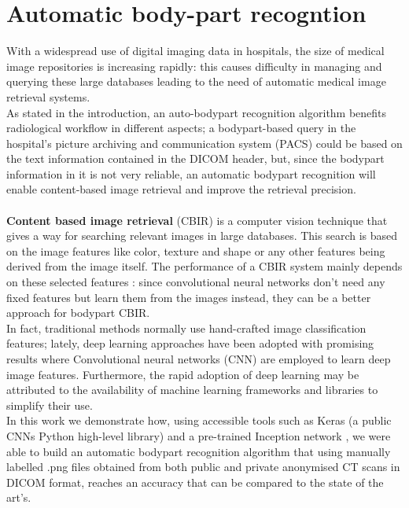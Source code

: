 \documentclass[../main.tex]{subfiles}
\begin{document}


\clearpage
\newpage
\section{Automatic body-part recogntion}
With a widespread use of digital imaging data in hospitals, the size of medical image repositories is increasing rapidly: this causes difficulty in managing and querying these large databases leading to the need of automatic medical image retrieval systems. \cite{Qayyum2017} \\
As stated in the introduction, an auto-bodypart recognition algorithm benefits radiological workflow in different aspects; a bodypart-based query in the hospital's picture archiving and communication system (PACS) could be based on the text information contained in the DICOM header, but, since the bodypart information in it is not very reliable, an automatic bodypart recognition will enable content-based image retrieval and improve the retrieval precision. \cite{Yan2016} \\ \\
\textbf{Content based image retrieval} (CBIR) is a computer vision technique that gives a way for searching relevant images in large databases. This search is based on the image features like color, texture and shape or any other features being derived from the image itself. The performance of a CBIR system mainly depends on these selected features \cite{Qayyum2017}: since convolutional neural networks don't need any fixed features but learn them from the images instead, they can be a better approach for bodypart CBIR.\\
In fact, traditional methods normally use hand-crafted image classification features; lately, deep learning approaches have been adopted with promising results where Convolutional neural networks (CNN) are employed to learn deep image features. \cite{Yan2018}
Furthermore, the rapid adoption of deep learning may be attributed to the availability of machine learning frameworks and libraries to simplify their use. \cite{Lakhani2018} \\
In this work we demonstrate how, using accessible tools such as Keras (a public CNNs Python high-level library) and a pre-trained Inception network \cite{Lakhani2018}, we were able to build an automatic bodypart recognition algorithm that using manually labelled .png files obtained from both public and private anonymised CT scans in DICOM format, reaches an accuracy that can be compared to the state of the art's. \cite{Qayyum2017} \cite{Yan2016} \cite{Yan2018}
\end{document}
